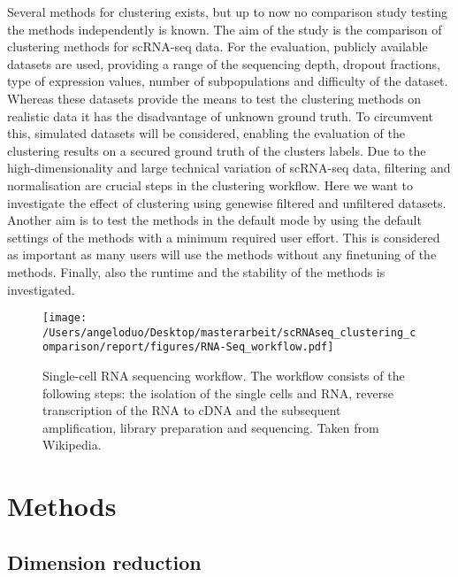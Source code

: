 \documentclass[12pt, a4paper]{article}\usepackage[]{graphicx}\usepackage[]{color}
\begin{document}
Several methods for clustering exists, but up to now no comparison study testing the methods independently is known.
The aim of the study is the comparison of clustering methods for scRNA-seq data. For the evaluation, publicly available datasets are used, providing a range of the sequencing depth, dropout fractions, type of expression values, number of subpopulations and difficulty of the dataset. Whereas these datasets provide the means to test the clustering methods on realistic data it has the disadvantage of unknown ground truth. To circumvent this, simulated datasets will be considered, enabling the evaluation of the clustering results on a secured ground truth of the clusters labels.  Due to the high-dimensionality and large technical variation of scRNA-seq data, filtering and normalisation are crucial steps in the clustering workflow. Here we want to investigate the effect of clustering using genewise filtered and unfiltered datasets. Another aim is to test the methods in the default mode by using the default settings of the methods with a minimum required user effort. This is considered as important as many users will use the methods without any finetuning of the methods.
Finally, also the runtime and the stability of the methods is investigated.

\begin{figure}[!h]
\begin{center}
\texttt{[image: /Users/angeloduo/Desktop/masterarbeit/scRNAseq\_clustering\_comparison/report/figures/RNA-Seq\_workflow.pdf]}
\caption{Single-cell RNA sequencing workflow. The workflow consists of the following steps: the isolation of the single cells and RNA, reverse transcription of the RNA to cDNA and the subsequent amplification, library preparation and sequencing. Taken from Wikipedia. }

\label{fig:flow}
\end{center}
\end{figure}

\clearpage

\newpage

\section{Methods}

\subsection{Dimension reduction}
\end{document}
